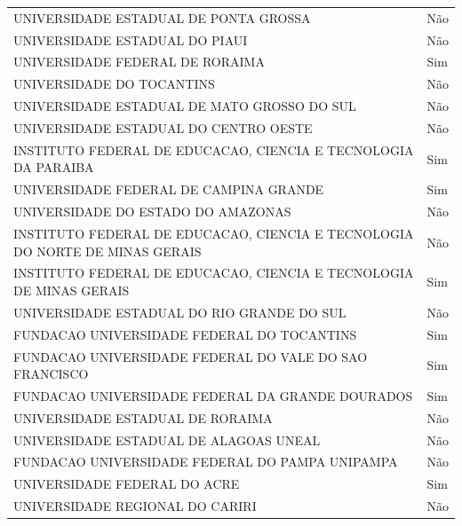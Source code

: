 {\begin{center}
\begin{longtable}[H]{ll}
\multicolumn{1}{l}{UNIVERSIDADE ESTADUAL DE PONTA GROSSA} & \multicolumn{1}{l}{Não} \\ 
\multicolumn{1}{l}{UNIVERSIDADE ESTADUAL DO PIAUI} & \multicolumn{1}{l}{Não} \\ 
\multicolumn{1}{l}{UNIVERSIDADE FEDERAL DE RORAIMA} & \multicolumn{1}{l}{Sim} \\ 
\multicolumn{1}{l}{UNIVERSIDADE DO TOCANTINS} & \multicolumn{1}{l}{Não} \\ 
\multicolumn{1}{l}{UNIVERSIDADE ESTADUAL DE MATO GROSSO DO SUL} & \multicolumn{1}{l}{Não} \\ 
\multicolumn{1}{l}{UNIVERSIDADE ESTADUAL DO CENTRO OESTE} & \multicolumn{1}{l}{Não} \\ 
\multicolumn{1}{l}{INSTITUTO FEDERAL DE EDUCACAO, CIENCIA E TECNOLOGIA DA PARAIBA} & \multicolumn{1}{l}{Sim} \\ 
\multicolumn{1}{l}{UNIVERSIDADE FEDERAL DE CAMPINA GRANDE} & \multicolumn{1}{l}{Sim} \\ 
\multicolumn{1}{l}{UNIVERSIDADE DO ESTADO DO AMAZONAS} & \multicolumn{1}{l}{Não} \\ 
\multicolumn{1}{l}{INSTITUTO FEDERAL DE EDUCACAO, CIENCIA E TECNOLOGIA DO NORTE DE MINAS GERAIS} & \multicolumn{1}{l}{Não} \\ 
\multicolumn{1}{l}{INSTITUTO FEDERAL DE EDUCACAO, CIENCIA E TECNOLOGIA DE MINAS GERAIS} & \multicolumn{1}{l}{Sim} \\ 
\multicolumn{1}{l}{UNIVERSIDADE ESTADUAL DO RIO GRANDE DO SUL} & \multicolumn{1}{l}{Não} \\ 
\multicolumn{1}{l}{FUNDACAO UNIVERSIDADE FEDERAL DO TOCANTINS} & \multicolumn{1}{l}{Sim} \\ 
\multicolumn{1}{l}{FUNDACAO UNIVERSIDADE FEDERAL DO VALE DO SAO FRANCISCO} & \multicolumn{1}{l}{Sim} \\ 
\multicolumn{1}{l}{FUNDACAO UNIVERSIDADE FEDERAL DA GRANDE DOURADOS} & \multicolumn{1}{l}{Sim} \\ 
\multicolumn{1}{l}{UNIVERSIDADE ESTADUAL DE RORAIMA} & \multicolumn{1}{l}{Não} \\ 
\multicolumn{1}{l}{UNIVERSIDADE ESTADUAL DE ALAGOAS UNEAL} & \multicolumn{1}{l}{Não} \\ 
\multicolumn{1}{l}{FUNDACAO UNIVERSIDADE FEDERAL DO PAMPA UNIPAMPA} & \multicolumn{1}{l}{Não} \\ 
\multicolumn{1}{l}{UNIVERSIDADE FEDERAL DO ACRE} & \multicolumn{1}{l}{Sim} \\ 
\multicolumn{1}{l}{UNIVERSIDADE REGIONAL DO CARIRI} & \multicolumn{1}{l}{Não} \\ 

\end{longtable}
\end{center}}

